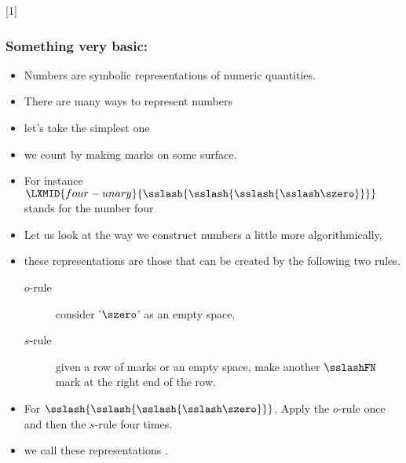 \documentclass[notes,mh]{mikoslides}
\begin{document}
\begin{module}[id=nat-basic]
  [1]{\sslashFN{}}

  \begin{frame}
  \frametitle{Something very basic:}
  \begin{itemize} 
  \item Numbers are symbolic representations of numeric quantities.
  \item There are many ways to represent numbers
  \item let's take the simplest one
  \item we count by making marks on some surface.
  \item For instance $\LXMID{four-unary}{\sslash{\sslash{\sslash{\sslash\szero}}}}$
    stands for the number four
\newpage
  \item Let us look at the way we construct numbers a little more algorithmically,
  \item
    \begin{definition}[display=flow,id=unary-nats-def-by-rules.def,for={szero,sslash}]
      these representations are those that can be created by the following two rules.
      \begin{description}
      \item[$o$-rule] consider '$\szero$' as an empty space.
      \item[$s$-rule] given a row of marks or an empty space, make another $\sslashFN$
        mark at the right end of the row.
      \end{description}
    \end{definition}
  \item
    \begin{example}[id=ex-four-unary,for=nat-basic]
      For $\sslash{\sslash{\sslash{\sslash\szero}}}$, Apply the $o$-rule once and then the $s$-rule four
      times.
    \end{example}
  \item
    \begin{definition}[id=unary-natural-numbers.def]
      we call these representations .
    \end{definition}
  \end{itemize}
\end{frame}



\end{module}
\end{document}
